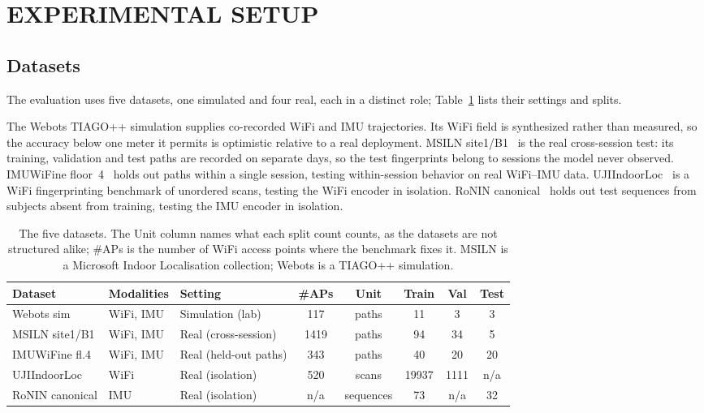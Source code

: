 \section{\uppercase{Experimental setup}}\label{sec:experiments}

\subsection{Datasets}

\noindent
The evaluation uses five datasets, one simulated and four real, each in a distinct
role; Table~\ref{tab:datasets} lists their settings and splits.

The Webots TIAGO++ simulation supplies co-recorded WiFi and IMU trajectories. Its WiFi field is synthesized rather than measured, so the accuracy
below one meter it permits is optimistic relative to a real deployment. MSILN
site1/B1~\cite{microsoft2021indoorloc} is the real cross-session test: its
training, validation and test paths are recorded on separate days, so the test
fingerprints belong to sessions the model never observed. IMUWiFine
floor~4~\cite{nurpeiissov2022imuwifine} holds out paths within a single session,
testing within-session behavior on real WiFi--IMU data.
UJIIndoorLoc~\cite{torressospedra2014ujiindoorloc} is a WiFi fingerprinting
benchmark of unordered scans, testing the WiFi encoder in isolation. RoNIN
canonical~\cite{yan2019ronin} holds out test sequences from subjects absent from
training, testing the IMU encoder in isolation.

\begin{table}[tb]
\caption{The five datasets. The Unit column names what each split count counts,
  as the datasets are not structured alike; \#APs is the number of WiFi access
  points where the benchmark fixes it. MSILN is a Microsoft Indoor Localisation
  collection; Webots is a TIAGO++ simulation.}\label{tab:datasets}
\centering
\begin{tabular}{|l|l|l|c|c|c|c|c|}\hline
Dataset & Modalities & Setting & \#APs & Unit & Train & Val & Test \\ \hline
Webots sim & WiFi, IMU & Simulation (lab) & 117 & paths & 11 & 3 & 3 \\ \hline
MSILN site1/B1 & WiFi, IMU & Real (cross-session) & 1419 & paths & 94 & 34 & 5 \\ \hline
IMUWiFine fl.4 & WiFi, IMU & Real (held-out paths) & 343 & paths & 40 & 20 & 20 \\ \hline
UJIIndoorLoc & WiFi & Real (isolation) & 520 & scans & 19937 & 1111 & n/a \\ \hline
RoNIN canonical & IMU & Real (isolation) & n/a & sequences & 73 & n/a & 32 \\ \hline
\end{tabular}
\end{table}

